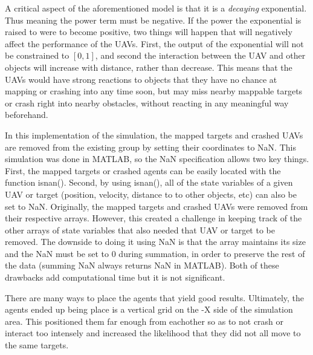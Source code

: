 \documentclass[a4paper,12pt]{report}
\begin{document}
A critical aspect of the aforementioned model is that it is a \textit{decaying} exponential. Thus meaning the power term must be negative. If the power the exponential is raised to were to become positive, two things will happen that will negatively affect the performance of the UAVs. First, the output of the exponential will not be constrained to $[0, 1]$, and second the interaction between the UAV and other objects will increase with distance, rather than decrease. This means that the UAVs would have strong reactions to objects that they have no chance at mapping or crashing into any time soon, but may miss nearby mappable targets or crash right into nearby obstacles, without reacting in any meaningful way beforehand.

In this implementation of the simulation, the mapped targets and crashed UAVs are removed from the existing group by setting their coordinates to NaN. This simulation was done in MATLAB, so the NaN specification allows two key things. First, the mapped targets or crashed agents can be easily located with the function isnan(). Second, by using isnan(), all of the state variables of a given UAV or target (position, velocity, distance to to other objects, etc) can also be set to NaN. Originally, the mapped targets and crashed UAVs were removed from their respective arrays. However, this created a challenge in keeping track of the other arrays of state variables that also needed that UAV or target to be removed. The downside to doing it using NaN is that the array maintains its size and the NaN must be set to 0 during summation, in order to preserve the rest of the data (summing NaN always returns NaN in MATLAB). Both of these drawbacks add computational time but it is not significant.

There are many ways to place the agents that yield good results. Ultimately, the agents ended up being place is a vertical grid on the -X side of the simulation area. This positioned them far enough from eachother so as to not crash or interact too intensely and increased the likelihood that they did not all move to the same targets.
\end{document}
